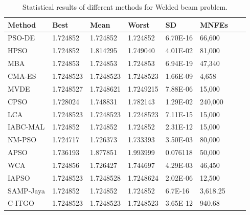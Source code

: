 
\begin{table*}[tp]
    \tiny
\begin{center}

\begin{tabular}{ P{2.0cm} P{2.0cm} P{2.0cm} P{2.0cm} P{2.0cm} P{2.0cm} P{2.0cm} P{2.0cm}  }
\hline
\textbf{Method} & \textbf{Best} & \textbf{Mean} & \textbf{Worst} & \textbf{SD} & \textbf{MNFEs} \\
\hline
PSO-DE & 1.724852 & 1.724852 & 1.724852 & 6.70E-16 & 66,600 \\
HPSO & 1.724852 & 1.814295 & 1.749040 & 4.01E-02 & 81,000 \\
MBA & 1.724853 & 1.724853 & 1.724853 & 6.94E-19 & 47,340 \\
CMA-ES & 1.7248523 & 1.7248523 & 1.7248523 & 1.66E-09 & 4,658 \\
MVDE & 1.7248527 & 1.7248621 & 1.7249215 & 7.88E-06 & 15,000 \\
CPSO & 1.728024 & 1.748831 & 1.782143 & 1.29E-02 & 240,000 \\
LCA & 1.7248523 & 1.7248523 & 1.7248523 & 7.11E-15 & 15,000 \\
IABC-MAL & 1.724852 & 1.724852 & 1.724852 & 2.31E-12 & 15,000 \\
NM-PSO & 1.724717 & 1.726373 & 1.733393 & 3.50E-03 & 80,000 \\
APSO & 1.736193 & 1.877851 & 1.993999 & 0.076118 & 50,000 \\
WCA & 1.724856 & 1.726427 & 1.744697 & 4.29E-03 & 46,450 \\
IAPSO & 1.7248523 & 1.7248528 & 1.7248624 & 2.02E-06 & 12,500 \\
SAMP-Jaya & 1.724852 & 1.724852 & 1.724852 & 6.7E-16 & 3,618.25 \\
C-ITGO & 1.7248523 & 1.7248523 & 1.7248523 & 3.65E-12 & 940.68 \\


\hline
\end{tabular}
\end{center}
\vspace*{-6mm}
\caption{Statistical results of different methods for Welded beam problem. \\[1em]}
\label{tab:WB}
\end{table*}

